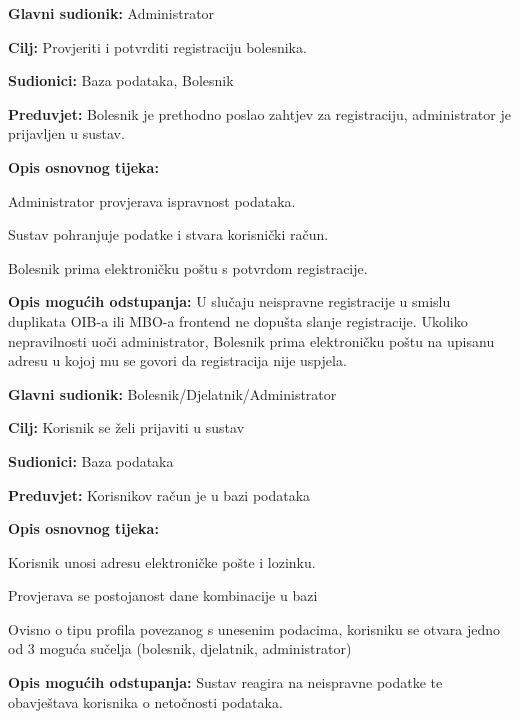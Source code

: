 \documentclass[12pt]{report}
\newenvironment{packed_enum}{
	\begin{enumerate}
		\setlength{\itemsep}{0pt}
		\setlength{\parskip}{0pt}
		\setlength{\parsep}{0pt}
	}{\end{enumerate}}
\begin{document}
	\item \textbf{Glavni sudionik:} Administrator
	\item \textbf{Cilj:} Provjeriti i potvrditi registraciju bolesnika.
	\item \textbf{Sudionici:} Baza podataka, Bolesnik
	\item \textbf{Preduvjet:} Bolesnik je prethodno poslao zahtjev za registraciju, administrator je prijavljen u sustav.
	\item \textbf{Opis osnovnog tijeka:}
	\begin{packed_enum}
		\item Administrator provjerava ispravnost podataka.
		\item Sustav pohranjuje podatke i stvara korisnički račun.
  		\item Bolesnik prima elektroničku poštu s potvrdom registracije.
	\end{packed_enum}
	\item \textbf{Opis mogućih odstupanja:}
	U slučaju neispravne registracije u smislu duplikata OIB-a ili MBO-a frontend ne dopušta slanje registracije. 
    	Ukoliko nepravilnosti uoči administrator, Bolesnik prima elektroničku poštu na upisanu adresu u kojoj mu se govori da registracija nije uspjela.
\closeusecase


	\item \textbf{Glavni sudionik:} Bolesnik/Djelatnik/Administrator
	\item \textbf{Cilj:} Korisnik se želi prijaviti u sustav 
	\item \textbf{Sudionici:} Baza podataka
	\item \textbf{Preduvjet:} Korisnikov račun je u bazi podataka
	\item \textbf{Opis osnovnog tijeka:}
	\begin{packed_enum}
		\item Korisnik unosi adresu elektroničke pošte i lozinku.
		\item Provjerava se postojanost dane kombinacije u bazi
		\item Ovisno o tipu profila povezanog s unesenim podacima, korisniku se otvara jedno od 3 moguća sučelja (bolesnik, djelatnik, administrator)
	\end{packed_enum}
	\item \textbf{Opis mogućih odstupanja:}
	Sustav reagira na neispravne podatke te obavještava korisnika o netočnosti podataka. \\
\closeusecase
\end{document}
